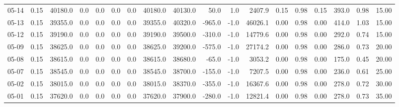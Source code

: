 \begin{threeparttable}
{\begin{tabular}{lrrrrrrrrrrrrrrrrr}
  05-14 &     0.15 & 40180.0 &               0.0 &               0.0 &                0.0 &                0.0 & 40180.0 & 40130.0 &       50.0 &                      1.0 &              2407.9 &       0.15 &      0.98 &           0.15 &            393.0 &            0.98 &                  15.00 \\
  05-13 &     0.15 & 39355.0 &               0.0 &               0.0 &                0.0 &                0.0 & 39355.0 & 40320.0 &     -965.0 &                     -1.0 &             46026.1 &       0.00 &      0.98 &           0.00 &            414.0 &            1.03 &                  15.00 \\
  05-12 &     0.15 & 39190.0 &               0.0 &               0.0 &                0.0 &                0.0 & 39190.0 & 39500.0 &     -310.0 &                     -1.0 &             14779.6 &       0.00 &      0.98 &           0.00 &            292.0 &            0.74 &                  15.00 \\
  05-09 &     0.15 & 38625.0 &               0.0 &               0.0 &                0.0 &                0.0 & 38625.0 & 39200.0 &     -575.0 &                     -1.0 &             27174.2 &       0.00 &      0.98 &           0.00 &            286.0 &            0.73 &                  20.00 \\
  05-08 &     0.15 & 38615.0 &               0.0 &               0.0 &                0.0 &                0.0 & 38615.0 & 38680.0 &      -65.0 &                     -1.0 &              3053.2 &       0.00 &      0.98 &           0.00 &            175.0 &            0.45 &                  20.00 \\
  05-07 &     0.15 & 38545.0 &               0.0 &               0.0 &                0.0 &                0.0 & 38545.0 & 38700.0 &     -155.0 &                     -1.0 &              7207.5 &       0.00 &      0.98 &           0.00 &            236.0 &            0.61 &                  25.00 \\
  05-02 &     0.15 & 38015.0 &               0.0 &               0.0 &                0.0 &                0.0 & 38015.0 & 38370.0 &     -355.0 &                     -1.0 &             16367.6 &       0.00 &      0.98 &           0.00 &            278.0 &            0.72 &                  30.00 \\
  05-01 &     0.15 & 37620.0 &               0.0 &               0.0 &                0.0 &                0.0 & 37620.0 & 37900.0 &     -280.0 &                     -1.0 &             12821.4 &       0.00 &      0.98 &           0.00 &            278.0 &            0.73 &                  35.00 \\

\end{tabular}}
\end{threeparttable}
